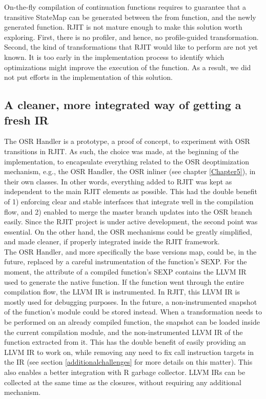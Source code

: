 On-the-fly compilation of continuation functions requires to guarantee that a transitive StateMap can be generated between the from function, and the newly generated function.
RJIT is not mature enough to make this solution worth exploring.
First, there is no profiler, and hence, no profile-guided transformation. 
Second, the kind of transformations that RJIT would like to perform are not yet known. 
It is too early in the implementation process to identify which optimizations might improve the execution of the function.
As a result, we did not put efforts in the implementation of this solution.\\

\subsection{A cleaner, more integrated way of getting a fresh IR}\label{section:cleanerIR}

The OSR Handler is a prototype, a proof of concept, to experiment with OSR transitions in RJIT. 
As such, the choice was made, at the beginning of the implementation, to encapsulate everything related to the OSR deoptimization mechanism, e.g., the OSR Handler, the OSR inliner (see chapter \ref{Chapter5}), in their own classes.
In other words, everything added to RJIT was kept as independent to the main RJIT elements as possible.
This had the double benefit of 1) enforcing clear and stable interfaces that integrate well in the compilation flow, and 2) enabled to merge the master branch updates into the OSR branch easily.
Since the RJIT project is under active development, the second point was essential.
On the other hand, the OSR mechanisms could be greatly simplified, and made cleaner, if properly integrated inside the RJIT framework.\\

The OSR Handler, and more specifically the base versions map, could be, in the future, replaced by a careful instrumentation of the function's SEXP. 
For the moment, the  attribute of a compiled function's SEXP contains the LLVM IR used to generate the native function.
If the function went through the entire compilation flow, the LLVM IR is instrumented. 
In RJIT, this  LLVM IR is mostly used for debugging purposes.
In the future, a non-instrumented snapshot of the function's module could be stored instead.
When a transformation needs to be performed on an already compiled function, the snapshot can be loaded inside the current compilation module, and the non-instrumented LLVM IR of the function extracted from it.
This has the double benefit of easily providing an LLVM IR to work on, while removing any need to fix call instruction targets in the IR (see section \ref{additionalchallenges} for more details on this matter).
This also enables a better integration with R garbage collector. 
LLVM IRs can be collected at the same time as the closures, without requiring any additional mechanism.\\

